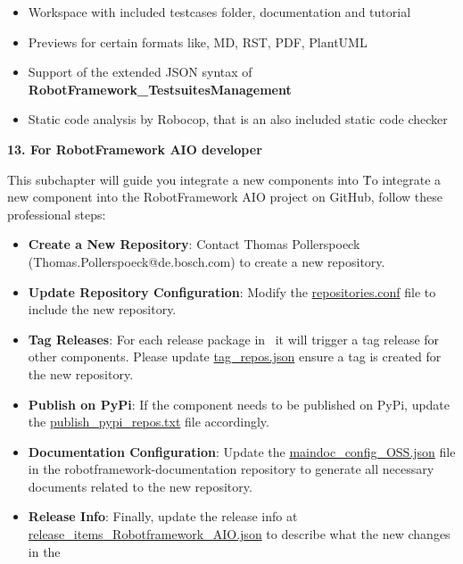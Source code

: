 \begin{itemize}
   \item Workspace with included testcases folder, documentation and tutorial
   \item Previews for certain formats like, MD, RST, PDF, PlantUML
   \item Support of the extended JSON syntax of \textbf{RobotFramework\_TestsuitesManagement}
   \item Static code analysis by Robocop, that is an also included static code checker
\end{itemize}


\textbf{13. For RobotFramework AIO developer}

This subchapter will guide you integrate a new components into \rfw\.  

To integrate a new component into the RobotFramework AIO project on GitHub, follow these professional steps:
\begin{itemize}
   \item \textbf{Create a New Repository}: Contact Thomas Pollerspoeck (Thomas.Pollerspoeck@de.bosch.com) to create a new repository.
   \item \textbf{Update Repository Configuration}: Modify the \href{https://github.com/test-fullautomation/RobotFramework_AIO/blob/develop/config/repositories/repositories.conf}{repositories.conf} file to include the new repository.
   \item \textbf{Tag Releases}: For each release package in \rfw\, it will trigger a tag release for other components. Please update \href{https://github.com/test-fullautomation/RobotFramework_AIO/blob/develop/config/repositories/tag_repos.json}{tag_repos.json} ensure a tag is created for the new repository.
   \item \textbf{Publish on PyPi}: If the component needs to be published on PyPi, update the \href{https://github.com/test-fullautomation/RobotFramework_AIO/blob/develop/config/repositories/publish_pypi_repos.txt}{publish_pypi_repos.txt} file accordingly.
   \item \textbf{Documentation Configuration}: Update the \href{https://github.com/test-fullautomation/robotframework-documentation/blob/develop/maindoc/maindoc_configs/maindoc_config_OSS.json}{maindoc_config_OSS.json} file in the robotframework-documentation repository to generate all necessary documents related to the new repository.
   \item \textbf{Release Info}: Finally, update the release info at \href{https://github.com/test-fullautomation/RobotFramework_AIO/blob/develop/config/robotframework_aio/release_items_Robotframework_AIO.json}{release_items_Robotframework_AIO.json} to describe what the new changes in the \rfw\
\end{itemize}

